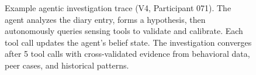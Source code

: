 \begin{figure}[t]
{
}
\caption{Example agentic investigation trace (V4, Participant 071). The agent analyzes the diary entry, forms a hypothesis, then autonomously queries sensing tools to validate and calibrate. Each tool call updates the agent's belief state. The investigation converges after 5 tool calls with cross-validated evidence from behavioral data, peer cases, and historical patterns.}
\label{fig:agentic_flow}
\end{figure}
